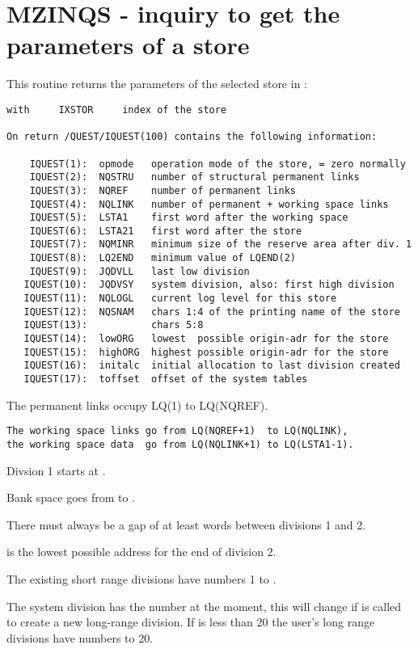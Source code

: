 \section{MZINQS - inquiry to get the parameters of a store}

This routine returns the parameters of the selected store in \IQUEST:


\begin{verbatim}
with     IXSTOR     index of the store

On return /QUEST/IQUEST(100) contains the following information:

    IQUEST(1):  opmode   operation mode of the store, = zero normally
    IQUEST(2):  NQSTRU   number of structural permanent links
    IQUEST(3):  NQREF    number of permanent links
    IQUEST(4):  NQLINK   number of permanent + working space links
    IQUEST(5):  LSTA1    first word after the working space
    IQUEST(6):  LSTA21   first word after the store
    IQUEST(7):  NQMINR   minimum size of the reserve area after div. 1
    IQUEST(8):  LQ2END   minimum value of LQEND(2)
    IQUEST(9):  JQDVLL   last low division
   IQUEST(10):  JQDVSY   system division, also: first high division
   IQUEST(11):  NQLOGL   current log level for this store
   IQUEST(12):  NQSNAM   chars 1:4 of the printing name of the store
   IQUEST(13):           chars 5:8
   IQUEST(14):  lowORG   lowest  possible origin-adr for the store
   IQUEST(15):  highORG  highest possible origin-adr for the store
   IQUEST(16):  initalc  initial allocation to last division created
   IQUEST(17):  toffset  offset of the system tables
\end{verbatim} 
The permanent links occupy  LQ(1) to LQ(NQREF).
\begin{verbatim}
The working space links go from LQ(NQREF+1)  to LQ(NQLINK),
the working space data  go from LQ(NQLINK+1) to LQ(LSTA1-1).
\end{verbatim} 
Divsion 1 starts at .

Bank space goes from  to .

There must always be a gap of at least  words between divisions 1 and 2.

 is the lowest possible address for the end of division 2.

The existing short range divisions have numbers 1 to .

The system division has the number  at the moment,
this will change if is called to create a new long-range division.
If  is less than 20 the user's long range divisions have numbers 
 to 20.

